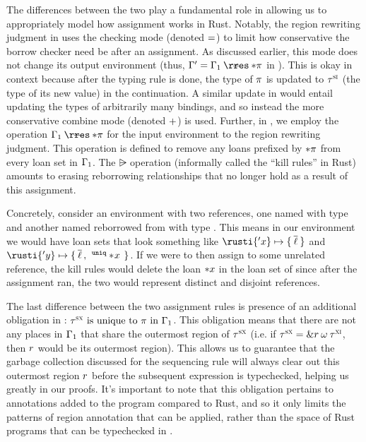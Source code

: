 The differences between the two play a fundamental role in allowing us to
appropriately model how assignment works in Rust. Notably, the region rewriting
judgment in  uses the checking mode (denoted $=$) to
limit how conservative the borrow checker need be after an assignment. As
discussed earlier, this mode does not change its output environment (thus,
$\oxvarctx^\prime = \oxrsub{\oxvarctx_1}{\oxderef{\oxplace}}$ in
). This is okay in context because after the typing rule is
done, the type of $\pi$ is updated to $\tau^\textsc{si}$ (the type of its new
value) in the continuation. A similar update in  would
entail updating the types of arbitrarily many bindings, and so instead the more
conservative combine mode (denoted $+$) is used. Further, in
, we employ the operation
$\oxrsub{\oxvarctx_1}{\oxderef{\oxplace}}$ for the input environment to the
region rewriting judgment. This operation is defined to remove any loans
prefixed by $* \pi$ from every loan set in $\Gamma_1$. The
$\rsub$ operation (informally called the ``kill rules'' in Rust) amounts to
erasing reborrowing relationships that no longer hold as a result of this
assignment.

Concretely, consider an environment with two references, one named 
with type  and another named  reborrowed from
 with type . This means in our environment we would
have loan sets that look something like
$\oxloanctxentry{\rusti{'x}}{\oxset{\overline{\oxloan}}}$ and
$\oxloanctxentry{\rusti{'y}}{ \oxset{\overline{\oxloan} \oxcomma \oxloanpkg{\oxmut}{\oxderef{\!\oxid}}} }$.
If we were to then assign to  some unrelated reference, the kill rules
would delete the loan $* x$ in the loan set of  since
after the assignment ran, the two would represent distinct and disjoint
references.

The last difference between the two assignment rules is presence of an
additional obligation in :
$\tau^\textsc{sx} \textrm{ is unique to } \pi \textrm{ in } \Gamma_1$. This obligation means that
there are not any places in $\Gamma_1$ that share the outermost region of
$\tau^\textsc{sx}$ (i.e. if $\tau^\textsc{sx} = \& r \: \omega \: \tau^\textsc{xi}$, then
$r$ would be its outermost region). This allows us to guarantee that the
garbage collection discussed for the sequencing rule will always clear out this
outermost region $r$ before the subsequent expression is typechecked,
helping us greatly in our proofs. It's important to note that this obligation
pertains to annotations added to the \lang program compared to Rust, and so it
only limits the patterns of region annotation that can be applied, rather than
the space of Rust programs that can be typechecked in \lang.

